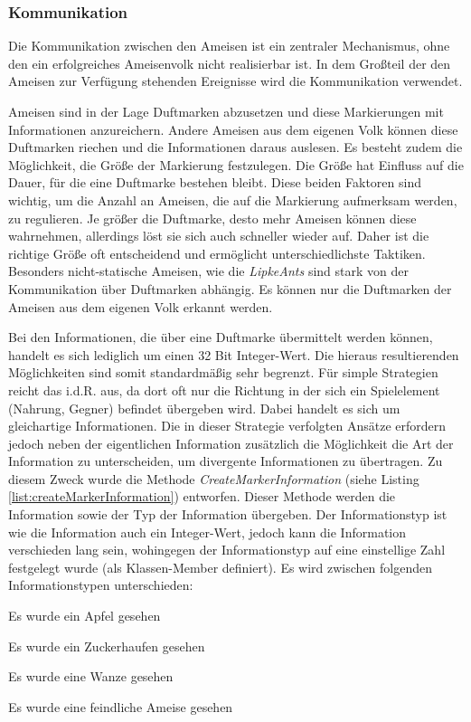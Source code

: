 \subsubsection{Kommunikation} \label{sssec:communication}
Die Kommunikation zwischen den Ameisen ist ein zentraler Mechanismus, ohne den ein erfolgreiches Ameisenvolk nicht realisierbar ist. In dem Großteil der den Ameisen zur Verfügung stehenden Ereignisse wird die Kommunikation verwendet. 

Ameisen sind in der Lage Duftmarken abzusetzen und diese Markierungen mit Informationen anzureichern. Andere Ameisen aus dem eigenen Volk können diese Duftmarken riechen und die Informationen daraus auslesen. Es besteht zudem die Möglichkeit, die Größe der Markierung festzulegen. Die Größe hat Einfluss auf die Dauer, für die eine Duftmarke bestehen bleibt. Diese beiden Faktoren sind wichtig, um die Anzahl an Ameisen, die auf die Markierung aufmerksam werden, zu regulieren. Je größer die Duftmarke, desto mehr Ameisen können diese wahrnehmen, allerdings löst sie sich auch schneller wieder auf. Daher ist die richtige Größe oft entscheidend und ermöglicht unterschiedlichste Taktiken. Besonders nicht-statische Ameisen, wie die \textit{LipkeAnts} sind stark von der Kommunikation über Duftmarken abhängig. Es können nur die Duftmarken der Ameisen aus dem eigenen Volk erkannt werden.

Bei den Informationen, die über eine Duftmarke übermittelt werden können, handelt es sich lediglich um einen 32 Bit Integer-Wert. Die hieraus resultierenden Möglichkeiten sind somit standardmäßig sehr begrenzt. Für simple Strategien reicht das i.d.R. aus, da dort oft nur die Richtung in der sich ein Spielelement (Nahrung, Gegner) befindet übergeben wird. Dabei handelt es sich um gleichartige Informationen. Die in dieser Strategie verfolgten Ansätze erfordern jedoch neben der eigentlichen Information zusätzlich die Möglichkeit die Art der Information zu unterscheiden, um divergente Informationen zu übertragen. Zu diesem Zweck wurde die Methode \textit{CreateMarkerInformation} (siehe Listing \ref{list:createMarkerInformation}) entworfen. Dieser Methode werden die Information sowie der Typ der Information übergeben. Der Informationstyp ist wie die Information auch ein Integer-Wert, jedoch kann die Information verschieden lang sein, wohingegen der Informationstyp auf eine einstellige Zahl festgelegt wurde (als Klassen-Member definiert). Es wird zwischen folgenden Informationstypen unterschieden:
\begin{compactitem}
   \item Es wurde ein Apfel gesehen
   \item Es wurde ein Zuckerhaufen gesehen
   \item Es wurde eine Wanze gesehen
   \item Es wurde eine feindliche Ameise gesehen
\end{compactitem}

